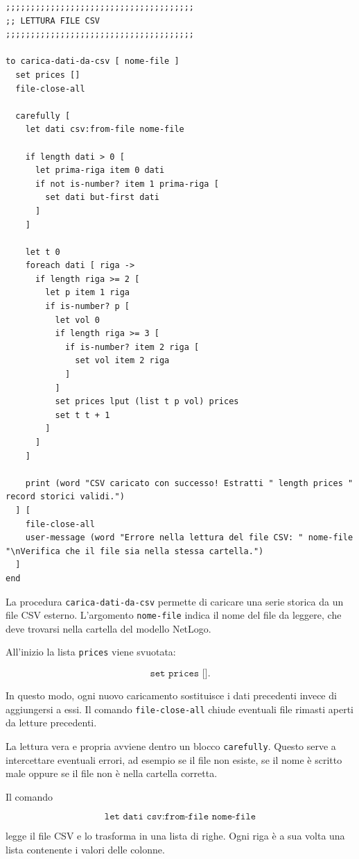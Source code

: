 \begin{lstlisting}[caption={Procedura per il caricamento dei dati da un file CSV}]
;;;;;;;;;;;;;;;;;;;;;;;;;;;;;;;;;;;;;;
;; LETTURA FILE CSV
;;;;;;;;;;;;;;;;;;;;;;;;;;;;;;;;;;;;;;

to carica-dati-da-csv [ nome-file ]
  set prices []
  file-close-all

  carefully [
    let dati csv:from-file nome-file

    if length dati > 0 [
      let prima-riga item 0 dati
      if not is-number? item 1 prima-riga [
        set dati but-first dati
      ]
    ]

    let t 0
    foreach dati [ riga ->
      if length riga >= 2 [
        let p item 1 riga
        if is-number? p [
          let vol 0
          if length riga >= 3 [
            if is-number? item 2 riga [
              set vol item 2 riga
            ]
          ]
          set prices lput (list t p vol) prices
          set t t + 1
        ]
      ]
    ]

    print (word "CSV caricato con successo! Estratti " length prices " record storici validi.")
  ] [
    file-close-all
    user-message (word "Errore nella lettura del file CSV: " nome-file "\nVerifica che il file sia nella stessa cartella.")
  ]
end
\end{lstlisting}

La procedura \texttt{carica-dati-da-csv} permette di caricare una serie storica
da un file CSV esterno. L'argomento \texttt{nome-file} indica il nome del file da
leggere, che deve trovarsi nella cartella del modello NetLogo.

All'inizio la lista \texttt{prices} viene svuotata:

\[
\texttt{set prices []}.
\]

In questo modo, ogni nuovo caricamento sostituisce i dati precedenti invece di
aggiungersi a essi. Il comando \texttt{file-close-all} chiude eventuali file
rimasti aperti da letture precedenti.

La lettura vera e propria avviene dentro un blocco \texttt{carefully}. Questo
serve a intercettare eventuali errori, ad esempio se il file non esiste, se il
nome è scritto male oppure se il file non è nella cartella corretta.

Il comando

\[
\texttt{let dati csv:from-file nome-file}
\]

legge il file CSV e lo trasforma in una lista di righe. Ogni riga è a sua volta
una lista contenente i valori delle colonne.

